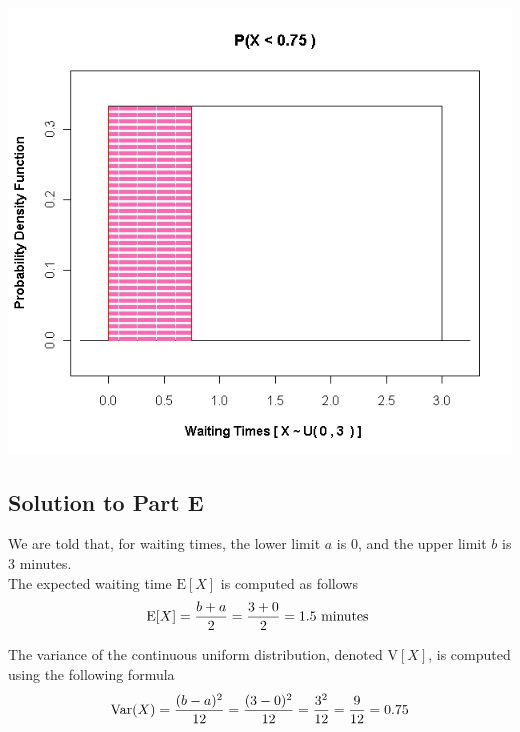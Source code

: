\documentclass[a4paper,12pt]{article}
\begin{document}
\begin{center}
\includegraphics[scale=0.35]{images/6AUniform3}

\end{center}



\subsection*{Solution to Part E}

We are told that, for waiting times,  the lower limit $a$ is 0, and the upper limit $b$ is 3 minutes. \\ \bigskip The expected waiting time $\textrm{E}[X]$ is computed as follows
\[
\textrm{E}[X] = {b + a \over 2} =  {3 + 0  \over 2}  = 1.5 \mbox{ minutes }
\]


\noindent The variance of the continuous uniform distribution, denoted $\textrm{V}[X]$,  is  computed using the following formula
\[
\textrm{Var}(X) = {(b - a)^2 \over 12} = {(3 - 0)^2 \over 12} =  {3^2 \over 12} = {9 \over 12} = 0.75
\]
\end{document}
